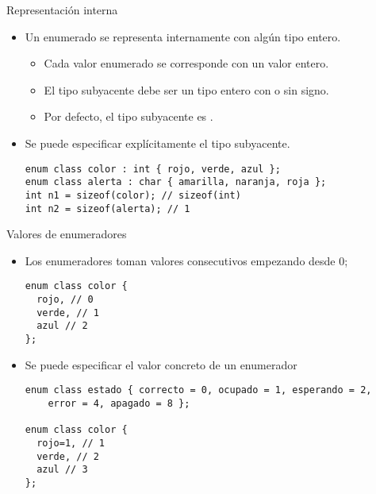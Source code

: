 \begin{frame}[fragile]{Representación interna}
\begin{itemize}
  \item Un enumerado se representa internamente con algún tipo entero.
    \begin{itemize}
      \item Cada valor enumerado se corresponde con un valor entero.
      \item El tipo subyacente debe ser un tipo entero con o sin signo.
      \item Por defecto, el tipo subyacente es .
    \end{itemize}
  \item Se puede especificar explícitamente el tipo subyacente.
\begin{lstlisting}
enum class color : int { rojo, verde, azul };
enum class alerta : char { amarilla, naranja, roja };
int n1 = sizeof(color); // sizeof(int)
int n2 = sizeof(alerta); // 1
\end{lstlisting}
\end{itemize}
\end{frame}

\begin{frame}[fragile]{Valores de enumeradores}
\begin{itemize}
  \item Los enumeradores toman valores consecutivos empezando desde 0;
\begin{lstlisting}
enum class color { 
  rojo, // 0
  verde, // 1
  azul // 2
};
\end{lstlisting}
  \item Se puede especificar el valor concreto de un enumerador
\begin{lstlisting}
enum class estado { correcto = 0, ocupado = 1, esperando = 2, 
    error = 4, apagado = 8 };

enum class color { 
  rojo=1, // 1
  verde, // 2
  azul // 3
};
\end{lstlisting}
\end{itemize}
\end{frame}


